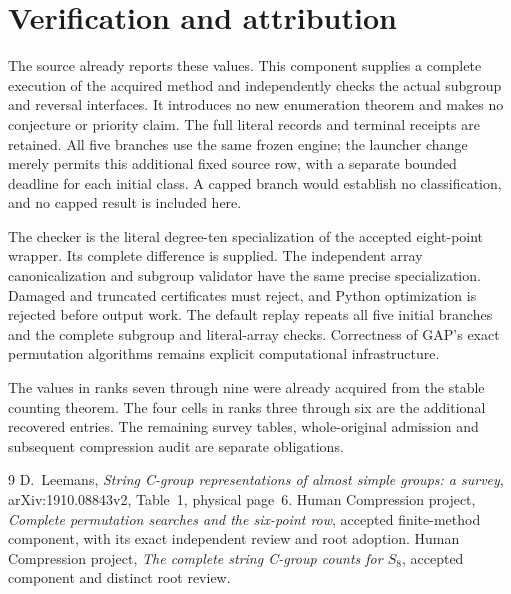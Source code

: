\documentclass[10pt,a4paper]{article}
\begin{document}
\section*{Verification and attribution}
The source already reports these values.  This component supplies a
complete execution of the acquired method and independently checks
the actual subgroup and reversal interfaces.  It introduces no new
enumeration theorem and makes no conjecture or priority claim.
The full literal records and terminal receipts are retained.  All
five branches use the same frozen engine; the launcher change merely
permits this additional fixed source row, with a separate bounded
deadline for each initial class.  A capped branch would establish
no classification, and no capped result is included here.

The checker is the literal degree-ten specialization of the accepted
eight-point wrapper.  Its complete difference is supplied.  The
independent array canonicalization and subgroup validator have the
same precise specialization.  Damaged and truncated certificates
must reject, and Python optimization is rejected before output work.
The default replay repeats all five initial branches and the complete
subgroup and literal-array checks.  Correctness of GAP's exact
permutation algorithms remains explicit computational infrastructure.

The values in ranks seven through nine were already acquired from
the stable counting theorem.  The four cells in ranks three through
six are the additional recovered entries.  The remaining survey
tables, whole-original admission and subsequent compression audit
are separate obligations.

\begin{thebibliography}{9}\small
{} D.~Leemans, \emph{String C-group representations of almost
simple groups: a survey}, arXiv:1910.08843v2, Table~1, physical page~6.
 Human Compression project, \emph{Complete permutation
searches and the six-point row}, accepted finite-method component,
with its exact independent review and root adoption.
 Human Compression project, \emph{The complete string
C-group counts for $S_8$}, accepted component and distinct root review.
\end{thebibliography}
\end{document}
